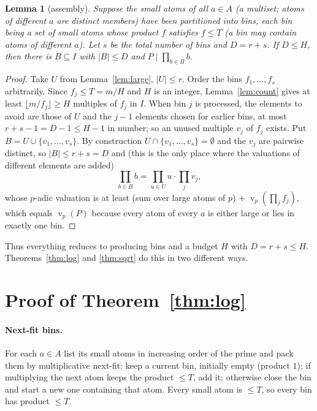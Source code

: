 \documentclass[11pt]{article}
\newtheorem{lemma}[theorem]{Lemma}
\theoremstyle{definition}
\DeclareMathOperator{\vp}{v}
\begin{document}
\begin{lemma}[assembly]\label{lem:assembly}
Suppose the small atoms of all $a\in A$ (a multiset; atoms of different $a$ are distinct members) have been
partitioned into \emph{bins}, each bin being a set of small atoms whose product $f$ satisfies $f\le T$ (a bin may
contain atoms of different $a$). Let $s$ be the total number of bins and
$D=r+s$. If $D\le H$, then there is $B\subseteq I$ with $|B|\le D$ and $P\mid\prod_{b\in B}b$.
\end{lemma}
\begin{proof}
Take $U$ from Lemma~\ref{lem:large}, $|U|\le r$. Order the bins $f_1,\dots,f_s$ arbitrarily. Since
$f_j\le T=m/H$ and $H$ is an integer, Lemma~\ref{lem:count} gives at least $\lfloor m/f_j\rfloor\ge H$ multiples of
$f_j$ in $I$.
When bin $j$ is processed, the elements to avoid are those of $U$ and the $j-1$ elements chosen for earlier
bins, at most $r+s-1=D-1\le H-1$ in number; so an unused multiple $v_j$ of $f_j$ exists. Put
$B=U\cup\{v_1,\dots,v_s\}$. By construction $U\cap\{v_1,\dots,v_s\}=\emptyset$ and the $v_j$ are pairwise
distinct, so $|B|\le r+s=D$ and (this is the only place where the valuations of different elements are added)
\[
 \prod_{b\in B}b=\prod_{u\in U}u\cdot\prod_{j}v_j ,
\]
whose $p$-adic valuation is at least (sum over large atoms of $p$) $+\;\vp_p(\prod_j f_j)$, which equals
$\vp_p(P)$ because every atom of every $a$ is either large or lies in exactly one bin.
\end{proof}

Thus everything reduces to producing bins and a budget $H$ with $D=r+s\le H$. Theorems~\ref{thm:log} and
\ref{thm:sqrt} do this in two different ways.

\section{Proof of Theorem~\ref{thm:log}}\label{sec:log}

\paragraph{Next-fit bins.} For each $a\in A$ list its small atoms in increasing order of the prime and pack
them by multiplicative next-fit: keep a current bin, initially empty (product $1$); if multiplying the next
atom keeps the product $\le T$, add it; otherwise close the bin and start a new one containing that atom.
Every small atom is $\le T$, so every bin has product $\le T$.
\end{document}
